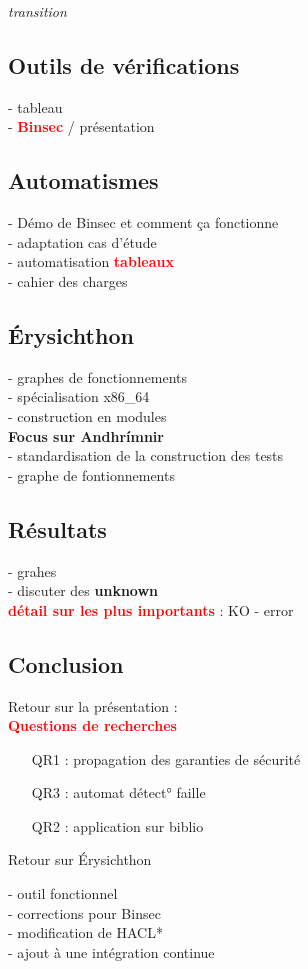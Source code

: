 \documentclass[10pt,a5paper]{article}
\newcommand{\important}[1]{\textbf{\textcolor{red}{#1}}}
\begin{document}
\textit{transition}

\subsection*{Outils de vérifications}
- tableau \\
- \important{Binsec} / présentation
\newpage
\subsection*{Automatismes}
\begin{multicols}{2}
  - Démo de Binsec et comment ça fonctionne\\
  - adaptation cas d'étude\\
  - automatisation \important{tableaux}\\
  - cahier des charges
\end{multicols}

\subsection*{Érysichthon}
- graphes de fonctionnements\\
- spécialisation x86\_64\\
- construction en modules\\
\textbf{Focus sur Andhrímnir}\\
- standardisation de la construction des tests\\
- graphe de fontionnements\\

\subsection*{Résultats}
- grahes\\
- discuter des \textbf{unknown}\\
\important{détail sur les plus importants} : KO - error


\subsection*{Conclusion}

Retour sur la présentation : \\
\important{Questions de recherches}
\begin{enumerate}
  \item[QR1 :] propagation des garanties de sécurité
  \item[QR3 :] automat détect° faille
  \item[QR2 :] application sur biblio
\end{enumerate}\smallbreak
Retour sur Érysichthon
\begin{multicols}{2}
- outil fonctionnel\\
- corrections pour Binsec\\
- modification de HACL*\\
- ajout à une intégration continue  \\
\end{multicols}
\end{document}
